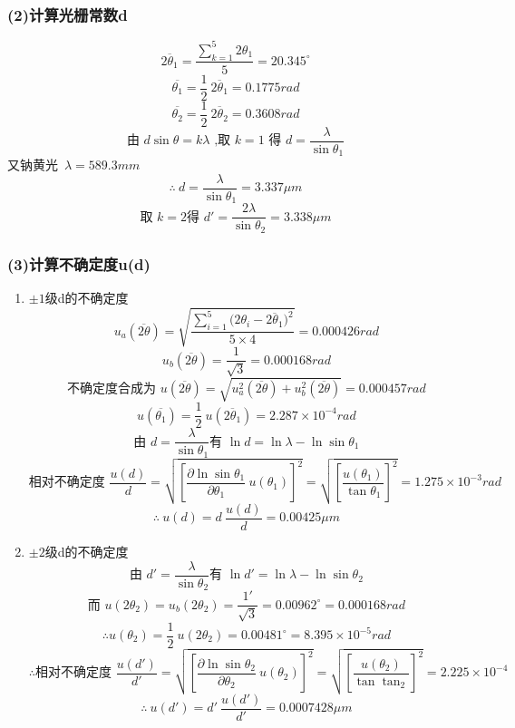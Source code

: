 \documentclass[11pt,a4paper,oneside]{article}
\begin{document}
\subsubsection*{(2)计算光栅常数d}

$$\overline{2{\theta}_1} = \displaystyle\frac{\sum_{k=1}^5 2{\theta}_1}{5} = 20.345^{\circ} $$
$$\overline{ {\theta}_1} = \displaystyle\frac12\ \overline{2{\theta}_1} = 0.1775rad $$
$$\overline{ {\theta}_2} = \displaystyle\frac12\ \overline{2{\theta}_2} = 0.3608rad$$
$$\text{由\ }d\sin{\theta} = k{\lambda}\text{\ ,取\ }k = 1\text{\ 得\ }d = \frac{\lambda}{\sin{\theta}_1}$$
又钠黄光\ ${\lambda} = 589.3mm$
$$\therefore \ d = \displaystyle\frac{\lambda}{\sin{\theta}_1}=3.337\mu m$$
$$\text{取\ }k=2 \displaystyle\text{得\ }d' = \frac{2\lambda}{\sin{\theta}_2}= 3.338\mu m$$
 
\subsubsection*{(3)计算不确定度u(d)}
\begin{enumerate}
  \item $\pm1$级d的不确定度
    $$u_a(\overline{2\theta}) = \displaystyle\sqrt{\frac{\sum_{i=1}^5{(2{\theta}_i-\overline{2{\theta}_1}})^2}{5\times4}}=0.000426rad$$
    $$u_b(\overline{2\theta}) = \displaystyle\frac{1}{\sqrt3} = 0.000168rad$$
    $$\text{不确定度合成为\ }u(\overline{2\theta}) = \sqrt{u_a^2(\overline{2\theta})+u_b^2(\overline{2\theta})} = 0.000457rad$$
    $$u(\overline{ {\theta}_1})= \displaystyle\frac12\ u(\overline{2{\theta}_1}) = 2.287{\times}10^{-4}rad$$
    $$\text{由\ }d = \frac{\lambda}{\sin{ {\theta}_1}} \text{有\ } \ln d = \ln{\lambda}-\ln{\sin{ {\theta}_1} }$$
    $$\text{相对不确定度\ }\frac{u(d)}{d} = \displaystyle\sqrt{ {\left[\frac{\partial{\ln{\sin{ {\theta}_1}}}}{\partial{ {\theta}_1} }\ u({\theta}_1)\right]}^2} = \sqrt{ {\left[\frac{u({\theta}_1)}{\tan{ {\theta}_1}}\right]}^2} = 1.275{\times}10^{-3}rad$$
    $$\therefore \ u(d) = \displaystyle d\ \frac{u(d)}{d} = 0.00425\mu m $$
  \item $\pm2$级d的不确定度
    $$\text{由\ }d' = \frac{\lambda}{\sin{ {\theta}_2}} \text{有\ } \ln d' = \ln{\lambda}-\ln{\sin{ {\theta}_2}}$$
    $$\text{而\ }u(2{\theta}_2) = u_b(2{\theta}_2) = \displaystyle\frac{1'}{\sqrt3} = {0.00962}^\circ = 0.000168rad $$
    $$\therefore u({\theta}_2) = \displaystyle\frac{1}{2}\ u(2{\theta}_2) = {0.00481}^{\circ} = 8.395\times 10^{-5}rad $$
    $$\therefore \text{相对不确定度\ }\frac{u(d')}{d'} = \displaystyle\sqrt{ {\left[\frac{\partial{\ln{\sin{ {\theta}_2}}}}{\partial{  {\theta}_2} }\ u({\theta}_2)\right]}^2} = \sqrt{ {\left[\frac{u({\theta}_2)}{\tan{ {\tan}_2}}\right]}^2} = 2.225{\times}10^{-4}$$
    $$\therefore \ u(d') = \displaystyle d'\ \frac{u(d')}{d'} = 0.0007428\mu m$$
\end{enumerate}
\end{document}
